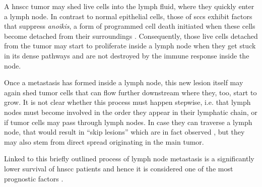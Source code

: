 \documentclass[\relativeRoot/main.tex]{subfiles}
\begin{document}
A \gls{hnscc} tumor may shed live cells into the lymph fluid, where they quickly enter a lymph node. In contrast to normal epithelial cells, those of \glspl{scc} exhibit factors that suppress \emph{anoikis}, a form of programmed cell death initiated when these cells become detached from their surroundings \cite{peltanova_effect_2019}. Consequently, those live cells detached from the tumor may start to proliferate inside a lymph node when they get stuck in its dense pathways and are not destroyed by the immune response inside the node.

Once a metastasis has formed inside a lymph node, this new lesion itself may again shed tumor cells that can flow further downstream where they, too, start to grow. It is not clear whether this process must happen stepwise, i.e. that lymph nodes must become involved in the order they appear in their lymphatic chain, or if tumor cells may pass through lymph nodes. In case they can traverse a lymph node, that would result in ``skip lesions'' which are in fact observed \cite{woolgar_topography_2007}, but they may also stem from direct spread originating in the main tumor.

Linked to this briefly outlined process of lymph node metastasis is a significantly lower survival of \gls{hnscc} patients and hence it is considered one of the most prognostic factors \cite{jones_level_1994,lim_distributions_2006,takes_staging_2004}.
\end{document}
